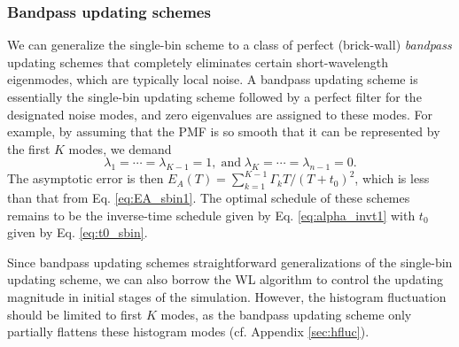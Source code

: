 \documentclass[reprint, superscriptaddress, floatfix]{revtex4-1}
\newcommand{\Err}{E}
\begin{document}
\subsubsection{\label{sec:bandpass}
Bandpass updating schemes}


We can generalize
the single-bin scheme to a class of
perfect (brick-wall) \emph{bandpass} updating schemes
that completely eliminates certain short-wavelength eigenmodes,
which are typically local noise.
%
A bandpass updating scheme is essentially
the single-bin updating scheme
followed by a perfect filter
for the designated noise modes,
and zero eigenvalues are assigned to these modes.
%
For example,
by assuming
that the PMF is so smooth
that it can be represented by the first $K$ modes,
%
we demand
%
\begin{equation}
  \lambda_1 = \cdots = \lambda_{K-1} = 1,
  \mathrm{\; and \;}
  \lambda_K = \cdots = \lambda_{n-1} = 0.
  \label{eq:lambda_bandpass}
\end{equation}
%
The asymptotic error is then
$\Err_A(T) = \sum_{ k = 1 }^{ K - 1 } \Gamma_k T/(T + t_0)^2$,
which is less than that from Eq. \eqref{eq:EA_sbin1}.
%
The optimal schedule of these schemes
remains to be the inverse-time schedule
given by Eq. \eqref{eq:alpha_invt1}
with $t_0$ given by Eq. \eqref{eq:t0_sbin}.
%

Since bandpass updating schemes
straightforward generalizations of
the single-bin updating scheme,
we can also borrow the WL algorithm
to control the updating magnitude
in initial stages of the simulation.
%
However, the histogram fluctuation should
be limited to first $K$ modes,
as the bandpass updating scheme
only partially flattens these histogram
modes (cf. Appendix \ref{sec:hfluc}).
\end{document}
